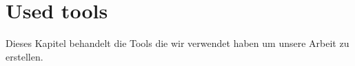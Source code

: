 \chapter{Used tools}
\label{chap:Used tools}

Dieses Kapitel behandelt die Tools die wir verwendet haben um unsere Arbeit zu erstellen.


